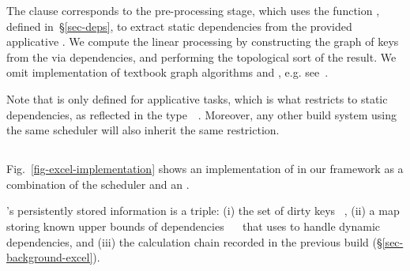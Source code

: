 The  clause corresponds to the pre-processing stage, which uses the
function , defined in~\S\ref{sec-deps}, to extract static
dependencies from the provided applicative . We compute the linear
processing  by constructing the graph of keys  from the
 via dependencies, and performing the topological sort of the result.
We omit implementation of textbook graph algorithms
 and , e.g. see~\cite{cormen2001introduction}.

Note that  is only defined for applicative tasks, which is what
restricts \Make to static dependencies, as reflected in the
type~~. Moreover, any other build system using
the same  scheduler will also inherit the same restriction.

\subsection{\Excel}\label{sec-implementation-excel}

Fig.~\ref{fig-excel-implementation} shows an implementation of \Excel in our
framework as a combination of the  scheduler and an
.

\Excel's persistently stored information is a triple: (i) the set of dirty keys
~, (ii) a map storing known upper bounds of dependencies
~~\hs{[@@k]} that \Excel uses to handle dynamic dependencies, and
(iii) the calculation chain \hs{[@@k]} recorded in the previous build
(\S\ref{sec-background-excel}).

